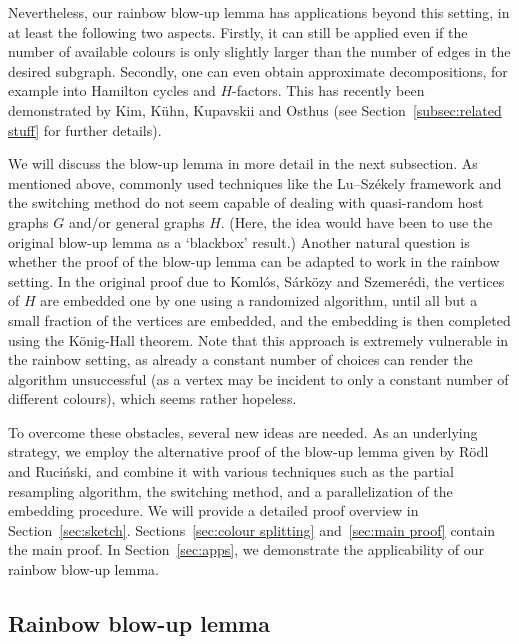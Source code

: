 \documentclass[10pt]{amsart}
\theoremstyle{definition}
\theoremstyle{claimstyle}
\theoremstyle{stepstyle}
\numberwithin{equation}{section}
\begin{document}
Nevertheless, our rainbow blow-up lemma has applications beyond this setting, in at least the following two aspects.
Firstly, it can still be applied even if the number of available colours is only slightly larger than the number of edges in the desired subgraph.
Secondly, one can even obtain approximate decompositions, for example into Hamilton cycles and $H$-factors.
This has recently been demonstrated by Kim, K\"uhn, Kupavskii and Osthus (see Section~\ref{subsec:related stuff} for further details).



We will discuss the blow-up lemma in more detail in the next subsection. As mentioned above, commonly used techniques like the Lu--Sz\'ekely framework and the switching method do not seem capable of dealing with quasi-random host graphs $G$ and/or general graphs $H$. (Here, the idea would have been to use the original blow-up lemma as a `blackbox' result.)
Another natural question is whether the proof of the blow-up lemma can be adapted to work in the rainbow setting. 
In the original proof due to Koml\'os, S\'ark\"ozy and Szemer\'edi, the vertices of $H$ are embedded one by one using a randomized algorithm, until all but a small fraction of the vertices are embedded, and the embedding is then completed using the K\"onig-Hall theorem. Note that this approach is extremely vulnerable in the rainbow setting, as already a constant number of choices can render the algorithm unsuccessful (as a vertex may be incident to only a constant number of different colours), which seems rather hopeless.

To overcome these obstacles, several new ideas are needed.
As an underlying strategy, we employ the alternative proof of the blow-up lemma given by R\"odl and Ruci\'nski,
and combine it with various techniques such as the partial resampling algorithm, the switching method, and a parallelization of the embedding procedure.
We will provide a detailed proof overview in Section~\ref{sec:sketch}. 
Sections~\ref{sec:colour splitting} and~\ref{sec:main proof} contain the main proof.
In Section~\ref{sec:apps}, we demonstrate the applicability of our rainbow blow-up lemma.



\subsection{Rainbow blow-up lemma}\label{subsec:blow-up intro}
\end{document}
